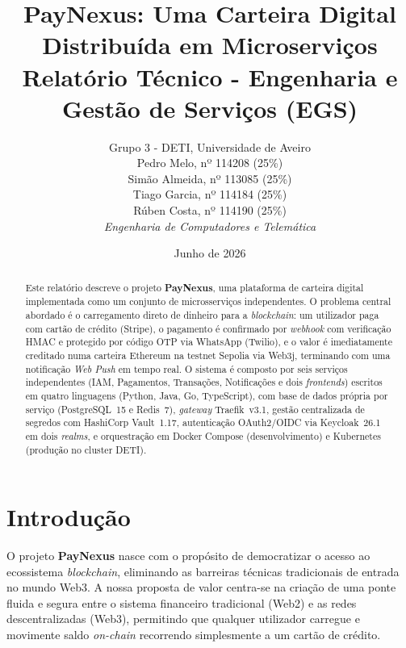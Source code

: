 \documentclass[12pt,a4paper]{article}
\begin{document}
\title{%
  \textbf{PayNexus: Uma Carteira Digital Distribuída em Microserviços}\\[0.5em]
  \large Relatório Técnico - Engenharia e Gestão de Serviços (EGS)
}
\author{
  Grupo 3 - DETI, Universidade de Aveiro\\[0.3em]
  Pedro Melo, nº 114208 (25\%)\\
  Simão Almeida, nº 113085 (25\%)\\
  Tiago Garcia, nº 114184 (25\%)\\
  Rúben Costa, nº 114190 (25\%)\\
  \small\textit{Engenharia de Computadores e Telemática}
}
\date{Junho de 2026}
\maketitle
\thispagestyle{fancy}

\begin{abstract}
Este relatório descreve o projeto \textbf{PayNexus}, uma plataforma de carteira digital
implementada como um conjunto de microsserviços independentes. O problema central
abordado é o carregamento direto de dinheiro para a \emph{blockchain}: um utilizador
paga com cartão de crédito (Stripe), o pagamento é confirmado por \emph{webhook} com
verificação HMAC e protegido por código OTP via WhatsApp (Twilio), e o valor é
imediatamente creditado numa carteira Ethereum na testnet Sepolia via Web3j,
terminando com uma notificação \emph{Web Push} em tempo real. O sistema é composto por
seis serviços independentes (IAM, Pagamentos, Transações, Notificações e dois
\emph{frontends}) escritos em quatro linguagens (Python, Java, Go, TypeScript), com
base de dados própria por serviço (PostgreSQL~15 e Redis~7), \emph{gateway} Traefik~v3.1,
gestão centralizada de segredos com HashiCorp Vault~1.17, autenticação OAuth2/OIDC via
Keycloak~26.1 em dois \emph{realms}, e orquestração em Docker Compose (desenvolvimento)
e Kubernetes (produção no cluster DETI).
\end{abstract}

\tableofcontents
\newpage

\section{Introdução}
\label{sec:introducao}

O projeto \textbf{PayNexus} nasce com o propósito de democratizar o acesso ao ecossistema 
\emph{blockchain}, eliminando as barreiras técnicas tradicionais de entrada no mundo Web3. 
A nossa proposta de valor centra-se na criação de uma ponte fluida e segura entre o sistema 
financeiro tradicional (Web2) e as redes descentralizadas (Web3), permitindo que qualquer 
utilizador carregue e movimente saldo \emph{on-chain} recorrendo simplesmente a um cartão de crédito.
\end{document}
